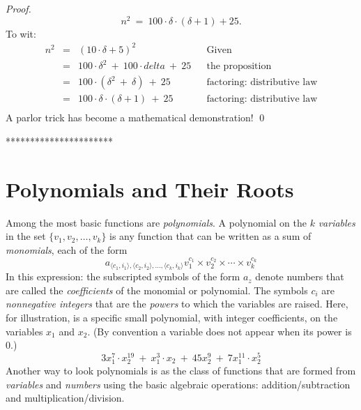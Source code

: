 {\begin{proof}
\[ n^2 \ = \ 100 \cdot \delta \cdot (\delta+1) + 25. \]
To wit: 
\[
\begin{array}{lclll}
n^2 & = & (10 \cdot \delta + 5)^2 & & \mbox{Given} \\
    & = & 100 \cdot \delta^2 \ + \ 100 \cdot delta \ + \ 25
              & & \mbox{the proposition} \\
    & = & 100 \cdot (\delta^2 \ + \ \delta) \ + \ 25
              & & \mbox{factoring: distributive law} \\
    & = & 100 \cdot \delta \cdot (\delta + 1) \ + \ 25
              & & \mbox{factoring: distributive law} \\
\end{array}
\]
A parlor trick has become a mathematical demonstration!
\qed
\end{proof}
**********************}


\section{Polynomials and Their Roots}
\label{sec:polynomials}

Among the most basic functions are {\it polynomials}.
 
A polynomial on the $k$ {\it variables} 
in the set $\{v_1, v_2, \ldots, v_k\}$ is any function that can be
written as a sum of {\it monomials}, 
 
each of the form
\begin{equation}
\label{eq:monomial}
a_{\langle c_1, i_1 \rangle, \langle c_2, i_2 \rangle, \ldots, 
\langle c_k, i_k \rangle} 
v_1^{c_1} \times v_2^{c_2} \times \cdots \times v_k^{c_k}
\end{equation}
In this expression: the subscripted symbols of the form $a_z$ denote
numbers that are called the {\it coefficients}
  of the
monomial or polynomial.  The symbols $c_i$ are {\em nonnegative
  integers} that are the {\it powers} 
 to which the variables are raised.  Here, for
illustration, is a specific small polynomial, with integer
coefficients, on the variables $x_1$ and $x_2$.  (By convention a
variable does not appear when its power is $0$.)
\[ 3 x_1^7 \cdot x_2^{19} \ + \ x_1^3 \cdot x_2 \ + \ 45 x_2^{9} \ + \ 
7 x_1^{11} \cdot x_2^{5}
\]
Another way to look polynomials is as the class of functions that are
formed from {\it variables} and {\it numbers} using the basic
algebraic operations: addition/subtraction and
multiplication/division.

